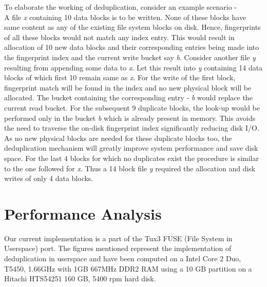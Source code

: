 \documentclass[final]{ols}
\begin{document}
To elaborate the working of deduplication, consider an example scenario - \\ 
A file \textit{x} containing 10 data blocks is to be written. None of these blocks have same content as any of the existing file system blocks on disk. Hence, fingerprints of all these blocks would not match any index entry. This would result in allocation of 10 new data blocks and their corresponding entries being made into the fingerprint index and the current write bucket say \textit{b}. 
Consider another file \textit{y} resulting from appending some data to \textit{x}. Let this result into \textit{y} containing 14 data blocks of which first 10 remain same as \textit{x}. For the write of the first block, fingerprint match will be found in the index and no new physical block will be allocated. The bucket containing the corresponding entry - \textit{b} would replace the current read bucket. For the subsequent 9 duplicate blocks, the look-up would be performed only in the bucket \textit{b} which is already present in memory. This avoids the need to traverse the on-disk fingerprint index significantly reducing disk I/O. As no new physical blocks are needed for these duplicate blocks too, the deduplication mechanism will greatly improve system performance and save disk space. For the last 4 blocks for which no duplicates exist the procedure is similar to the one followed for \textit{x}. 
Thus a 14 block file \textit{y} required the allocation and disk writes of only 4 data blocks. 

\section{Performance Analysis}
Our current implementation is a part of the Tux3 FUSE (File System in Userspace) port. The figures mentioned represent the implementation of deduplication in userspace and have been computed on a Intel Core 2 Duo, T5450, 1.66GHz with 1GB 667MHz DDR2 RAM using a 10 GB partition on a Hitachi HTS54251 160 GB, 5400 rpm hard disk.
\end{document}
